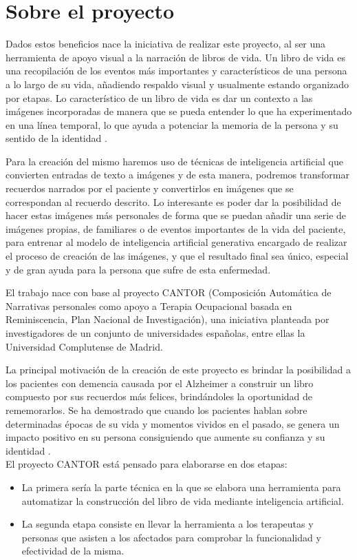 \section{Sobre el proyecto}

Dados estos beneficios nace la iniciativa de realizar este proyecto, al ser una herramienta de apoyo visual a la narración de libros de vida. Un libro de vida es una recopilación de los eventos más importantes y característicos de una persona a lo largo de su vida, añadiendo respaldo visual y usualmente estando organizado por etapas. Lo característico de un libro de vida es dar un contexto a las imágenes incorporadas de manera que se pueda entender lo que ha experimentado en una línea temporal, lo que ayuda a potenciar la memoria de la persona y su sentido de la identidad \citep{librovida}. 

Para la creación del mismo haremos uso de técnicas de inteligencia artificial que convierten entradas de texto a imágenes y de esta manera, podremos transformar recuerdos narrados por el paciente y convertirlos en imágenes que se correspondan al recuerdo descrito. Lo interesante es poder dar la posibilidad de hacer estas imágenes más personales de forma que se puedan añadir una serie de imágenes propias, de familiares o de eventos importantes de la vida del paciente, para entrenar al modelo de inteligencia artificial generativa encargado de realizar el proceso de creación de las imágenes, y que el resultado final sea único, especial y de gran ayuda para la persona que sufre de esta enfermedad. 

El trabajo nace con base al proyecto CANTOR (Composición Automática de Narrativas personales como apoyo a Terapia Ocupacional basada en Reminiscencia, Plan Nacional de Investigación), una iniciativa planteada por investigadores de un conjunto de universidades españolas, entre ellas la Universidad Complutense de Madrid.

La principal motivación de la creación de este proyecto es brindar la posibilidad a los pacientes con demencia causada por el Alzheimer a construir un libro compuesto por sus recuerdos más felices, brindándoles la oportunidad de rememorarlos. Se ha demostrado que cuando los pacientes hablan sobre determinadas épocas de su vida y momentos vividos en el pasado, se genera un impacto positivo en su persona consiguiendo que aumente su confianza y su identidad \citep{UCMcantor}.\\

El proyecto CANTOR está pensado para elaborarse en dos etapas: 
\begin{itemize}
	\item La primera sería la parte técnica en la que se elabora una herramienta para automatizar la construcción del libro de vida mediante inteligencia artificial. 
	\item La segunda etapa consiste en llevar la herramienta a los terapeutas y personas que asisten a los afectados para comprobar la funcionalidad y efectividad de la misma. 
\end{itemize}

